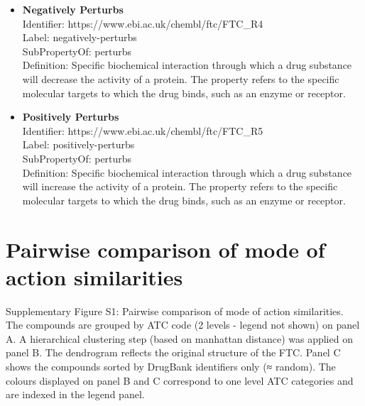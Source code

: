 \documentclass{bioinfo}
\begin{document}
\begin{itemize}
\item \textbf{Negatively Perturbs} \\
Identifier: https://www.ebi.ac.uk/chembl/ftc/FTC\_R4 \\
Label: negatively-perturbs \\
SubPropertyOf: perturbs \\
Definition: Specific biochemical interaction through which a drug substance will decrease the activity of a protein. 
The property refers to the specific molecular targets to which the drug binds, such as an enzyme or receptor.
\end{itemize}

\begin{itemize}
\item \textbf{Positively Perturbs} \\
Identifier: https://www.ebi.ac.uk/chembl/ftc/FTC\_R5 \\
Label: positively-perturbs \\
SubPropertyOf: perturbs \\
Definition: Specific biochemical interaction through which a drug substance will increase the activity of a protein. 
The property refers to the specific molecular targets to which the drug binds, such as an enzyme or receptor.
\end{itemize}

\section*{Pairwise comparison of mode of action similarities}

Supplementary Figure S1: Pairwise comparison of mode of action similarities. 
The compounds are grouped by ATC code (2 levels - legend not shown) on panel A. 
A hierarchical clustering step (based on manhattan distance) was applied on panel B. 
The dendrogram reflects the original structure of the FTC. 
Panel C shows the compounds sorted by DrugBank identifiers only (≈ random). 
The colours displayed on panel B and C correspond to one level ATC categories and are indexed in the legend panel.
\end{document}
